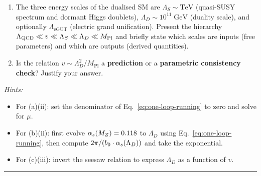 \documentclass[11pt,a4paper]{article}
\begin{document}
\begin{enumerate}[label=(\alph*)]
\begin{enumerate}[label=(\roman*)]
      \item The three energy scales of the dualised SM are
        $\Lambda_S \sim \text{TeV}$ (quasi-SUSY spectrum and dormant
        Higgs doublets),
        $\Lambda_D \sim 10^{11}\;\text{GeV}$ (duality scale), and
        optionally $\Lambda_{\text{eGUT}}$ (electric grand unification).
        Present the hierarchy
        $\Lambda_{\mathrm{QCD}} \ll v \ll \Lambda_S \ll \Lambda_D
        \ll M_{\text{Pl}}$
        and briefly state which scales are inputs (free parameters) and
        which are outputs (derived quantities).

      \item Is the relation $v \sim \Lambda_D^2 / M_{\text{Pl}}$ a
        \textbf{prediction} or a \textbf{parametric consistency check}?
        Justify your answer.
    \end{enumerate}

\end{enumerate}

\medskip

\noindent\textit{Hints:}
\begin{itemize}
  \item For (a)(ii): set the denominator of
    Eq.~\eqref{eq:one-loop-running} to zero and solve for
    $\mu$.
  \item For (b)(ii): first evolve $\alpha_s(M_Z) = 0.118$ to
    $\Lambda_D$ using Eq.~\eqref{eq:one-loop-running}, then compute
    $2\pi/(b_0 \cdot \alpha_s(\Lambda_D))$ and take the exponential.
  \item For (c)(iii): invert the seesaw relation to express
    $\Lambda_D$ as a function of $v$.
\end{itemize}

\bigskip
\hrule
\bigskip
\end{document}
